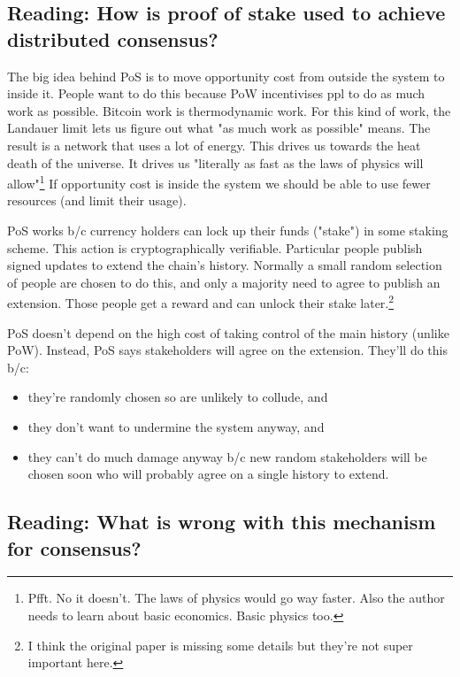 \documentclass{article}
\begin{document}
\subsection{Reading: How is proof of stake used to achieve distributed consensus?}

The big idea behind PoS is to move opportunity cost from outside the system to inside it. People want to do this because PoW incentivises ppl to do as much work as possible. Bitcoin work is thermodynamic work. For this kind of work, the Landauer limit lets us figure out what "as much work as possible" means. The result is a network that uses a lot of energy. This drives us towards the heat death of the universe. It drives us "literally as fast as the laws of physics will allow"\footnote{Pfft. No it doesn't. The laws of physics would go way faster. Also the author needs to learn about basic economics. Basic physics too.} If opportunity cost is inside the system we should be able to use fewer resources (and limit their usage).

PoS works b/c currency holders can lock up their funds ("stake") in some staking scheme. This action is cryptographically verifiable. Particular people publish signed updates to extend the chain's history. Normally a small random selection of people are chosen to do this, and only a majority need to agree to publish an extension. Those people get a reward and can unlock their stake later.\footnote{I think the original paper is missing some details but they're not super important here.}

PoS doesn't depend on the high cost of taking control of the main history (unlike PoW). Instead, PoS says stakeholders will agree on the extension. They'll do this b/c:
\begin{itemize}
    \item they're randomly chosen so are unlikely to collude, and 
    \item they don't want to undermine the system anyway, and
    \item they can't do much damage anyway b/c new random stakeholders will be chosen soon who will probably agree on a single history to extend.
\end{itemize}

\subsection{Reading: What is wrong with this mechanism for consensus?}
\end{document}
